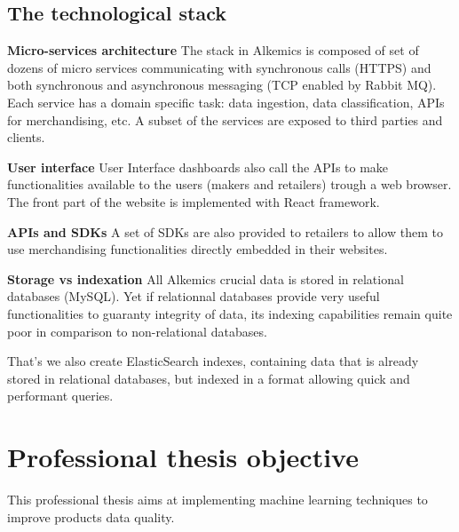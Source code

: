 \subsection{The technological stack}

\textbf{Micro-services architecture}
The stack in Alkemics is composed of set of dozens of micro services communicating with synchronous calls (HTTPS) and both synchronous and asynchronous messaging (TCP enabled by Rabbit MQ).
Each service has a domain specific task: data ingestion, data classification, APIs for merchandising, etc. A subset of the services are exposed to third parties and clients.

\textbf{User interface}
User Interface dashboards also call the APIs to make functionalities available to the users (makers and retailers) trough a web browser.
The front part of the website is implemented with React framework.

\textbf{APIs and SDKs}
A set of SDKs are also provided to retailers to allow them to use merchandising functionalities directly embedded in their websites.

\textbf{Storage vs indexation}
All Alkemics crucial data is stored in relational databases (MySQL). Yet if relationnal databases provide very useful functionalities to guaranty integrity of data, its indexing capabilities remain quite poor in comparison to non-relational databases.

That's we also create ElasticSearch indexes, containing data that is already stored in relational databases, but indexed in a format allowing quick and performant queries.


\section{Professional thesis objective}

This professional thesis aims at implementing machine learning techniques to improve products data quality.
